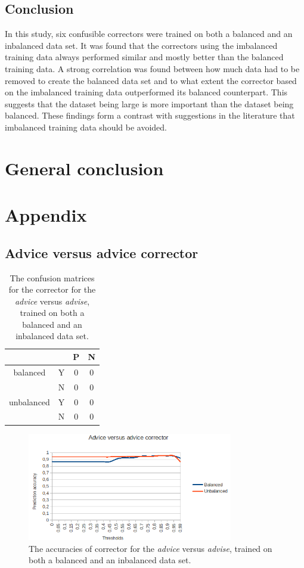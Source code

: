 \documentclass[12pt]{article}
\let\stdsection\section
\renewcommand\section{\newpage\stdsection}
\begin{document}
\subsection{Conclusion}
In this study, six confusible correctors were trained on both a balanced and an inbalanced data set. It was found that the correctors using the imbalanced training data always performed similar and mostly better than the balanced training data. A strong correlation was found between how much data had to be removed to create the balanced data set and to what extent the corrector based on the imbalanced training data outperformed its balanced counterpart. This suggests that the dataset being large is more important than the dataset being balanced. These findings form a contrast with suggestions in the literature that imbalanced training data should be avoided.

\section{General conclusion}

\section{Appendix}

\subsection{Advice versus advice corrector}

\begin{table}[H] \footnotesize
\centering
\begin{tabular}{|c|c|c|c|}
\hline
&&P&N\\
\hline
balanced&Y&0&0\\
&N&0&0\\
\hline
\hline
unbalanced&Y&0&0\\
&N&0&0\\
\hline
\end{tabular}
\caption{The confusion matrices for the corrector for the \emph{advice} versus \emph{advise}, trained on both a balanced and an inbalanced data set.}
\end{table}

\begin{figure}[H]
\centering
\includegraphics[width=0.8\textwidth]{accuracy_adviceadvise.png}
\caption{The accuracies of corrector for the \emph{advice} versus \emph{advise}, trained on both a balanced and an inbalanced data set.}
\end{figure}
\end{document}
